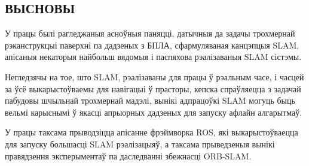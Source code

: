 \begin{center}
    \section*{ВЫСНОВЫ}
\end{center}

У працы былі рагледжаныя асноўныя паняцці, датычныя да задачы трохмернай рэканструкцыі
паверхні па дадзеных з БПЛА, сфармуляваная канцэпцыя SLAM, апісаныя некаторыя
найбольш вядомыя і паспяхова рэалізаваныя SLAM сістэмы.

Негледзячы на тое, што SLAM, рэалізаваны для працы ў рэальным часе, і часцей за ўсё выкарыстоўваемы
для навігацыі ў прасторы, кепска спраўляецца з задачай пабудовы шчыльнай трохмернай
мадэлі, вынікі адпрацоўкі SLAM могуць быць вельмі карыснымі ў якасці апрыорных
дадзеных для запуску афлайн алгарытмаў.

У працы таксама прыводзіцца апісанне фрэймворка ROS, які выкарыстоўваецца для
запуску большасці SLAM рэалізацыяў, а таксама прыведзеныя вынікі правядзення
эксперыментаў па даследванні збежнасці ORB-SLAM.

\newpage
